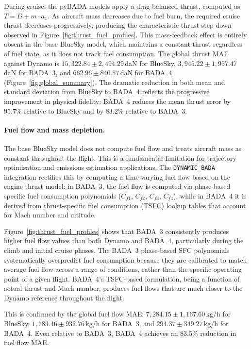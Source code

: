 During cruise, the pyBADA models apply a drag-balanced thrust, computed as $T = D + m \cdot a_x$. As aircraft mass decreases due to fuel burn, the required cruise thrust decreases progressively, producing the characteristic thrust-step-down observed in Figure~\ref{fig:thrust_fuel_profiles}. This mass-feedback effect is entirely absent in the base BlueSky model, which maintains a constant thrust regardless of fuel state, as it does not track fuel consumption. The global thrust MAE against Dynamo is $15{,}322.84 \pm 2{,}494.29$\,daN for BlueSky, $3{,}945.22 \pm 1{,}957.47$\,daN for BADA~3, and $662.96 \pm 840.57$\,daN for BADA~4 (Figure~\ref{fig:global_summary}). The dramatic reduction in both mean and standard deviation from BlueSky to BADA~4 reflects the progressive improvement in physical fidelity: BADA~4 reduces the mean thrust error by $95.7\%$ relative to BlueSky and by $83.2\%$ relative to BADA~3.

\paragraph{Fuel flow and mass depletion.}
The base BlueSky model does not compute fuel flow and treats aircraft mass as constant throughout the flight. This is a fundamental limitation for trajectory optimisation and emissions estimation applications. The \texttt{DYNAMIC\_BADA} integration rectifies this by computing a time-varying fuel flow based on the engine thrust model: in BADA~3, the fuel flow is computed via phase-based specific fuel consumption polynomials ($C_{f1}$, $C_{f2}$, $C_{f3}$, $C_{f4}$), while in BADA~4 it is derived from thrust-specific fuel consumption (TSFC) lookup tables that account for Mach number and altitude.

Figure~\ref{fig:thrust_fuel_profiles} shows that BADA~3 consistently produces higher fuel flow values than both Dynamo and BADA~4, particularly during the climb and initial cruise phases. The BADA~3 phase-based SFC polynomials systematically overpredict fuel consumption because they are calibrated to match average fuel flow across a range of conditions, rather than the specific operating point of a given flight. BADA~4's TSFC-based formulation, being a function of actual thrust and Mach number, produces fuel flows that are much closer to the Dynamo reference throughout the flight.

This is confirmed by the global fuel flow MAE: $7{,}284.15 \pm 1{,}167.60$\,kg/h for BlueSky, $1{,}783.46 \pm 932.76$\,kg/h for BADA~3, and $294.37 \pm 349.27$\,kg/h for BADA~4. Even relative to BADA~3, BADA~4 achieves an $83.5\%$ reduction in fuel flow MAE.

